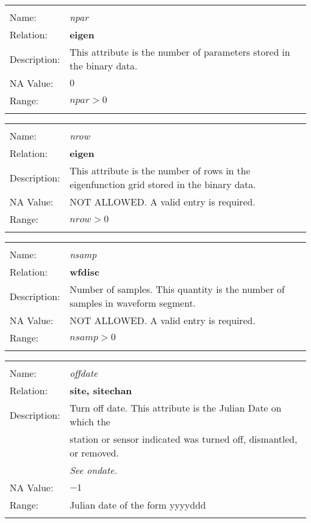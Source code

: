 \begin{tabular*}{6.5 in}{ll} \hline
\\
Name: & {\it npar} \\
Relation: & {\bf eigen} \\
Description: & This attribute is the number of parameters stored in the binary data. \\
NA Value: & $0$ \\
Range: & $npar > 0$  \\
&\\
\end{tabular*}
\begin{tabular*}{6.5 in}{ll} \hline
\\
Name: & {\it nrow} \\
Relation: & {\bf eigen} \\
Description: & This attribute is the number of rows in the eigenfunction grid stored in the binary data. \\
NA Value: & NOT ALLOWED. A valid entry is required. \\
Range: & $nrow > 0$ \\
&\\
\end{tabular*}
\begin{tabular*}{6.5 in}{ll} \hline
\\
Name: & {\it nsamp} \\
Relation: & {\bf wfdisc} \\
Description: & Number of samples. This quantity is the number of samples in waveform segment. \\
NA Value: & NOT ALLOWED. A valid entry is required. \\
Range: & $nsamp > 0$ \\
&\\
\end{tabular*}
\begin{tabular*}{6.5 in}{ll} \hline
\\
Name: & {\it offdate} \\
Relation: & {\bf site, sitechan} \\
Description: & Turn off date. This attribute is the Julian Date on which the \\
& station or sensor indicated was turned off, dismantled, or removed. \\
& {\it See ondate.} \\
NA Value: & $-1$ \\
Range: & Julian date of the form yyyyddd \\
& \\
\end{tabular*}

